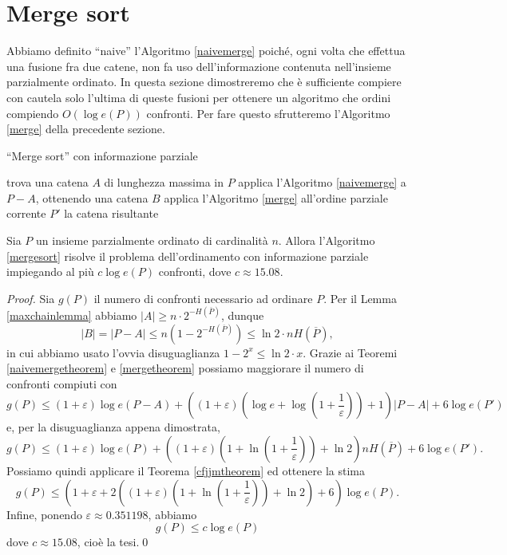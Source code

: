 \section{Merge sort} Abbiamo definito ``naive'' l'Algoritmo \ref{naivemerge} poich\'e, ogni volta che effettua una fusione fra due catene, non fa uso dell'informazione contenuta nell'insieme parzialmente ordinato. In questa sezione dimostreremo che \`e sufficiente compiere con cautela solo l'ultima di queste fusioni per ottenere un algoritmo che ordini compiendo \(O(\log{e(P)})\) confronti. Per fare questo sfrutteremo l'Algoritmo \ref{merge} della precedente sezione. 
\begin{algorithm}
	\caption{``Merge sort'' con informazione parziale} \label{mergesort} 
	\begin{algorithmic}
		[1] \STATE trova una catena \(A\) di lunghezza massima in \(P\) \STATE applica l'Algoritmo \ref{naivemerge} a \(P-A\), ottenendo una catena \(B\) \STATE applica l'Algoritmo \ref{merge} all'ordine parziale corrente \(P'\) \RETURN la catena risultante 
	\end{algorithmic}
\end{algorithm}
\begin{theorem}
	\label{mergesorttheorem} Sia \(P\) un insieme parzialmente ordinato di cardinalità \(n\). Allora l'Algoritmo \ref{mergesort} risolve il problema dell'ordinamento con informazione parziale impiegando al più \(c \log{e(P)}\) confronti, dove \(c\approx 15.08\). 
\end{theorem}
\begin{proof}
	Sia \(g(P)\) il numero di confronti necessario ad ordinare \(P\). Per il Lemma \ref{maxchainlemma} abbiamo \(|A|\ge n\cdot 2^{-H(\overline{P})}\), dunque
	\[|B|=|P-A|\le n\left(1-2^{-H(\overline{P})}\right)\le\ln{2}\cdot nH(\overline{P}),\]
	in cui abbiamo usato l'ovvia disuguaglianza \(1-2^{x}\le\ln{2}\cdot x\). Grazie ai Teoremi \ref{naivemergetheorem} e \ref{mergetheorem} possiamo maggiorare il numero di confronti compiuti con
	\[g(P)\le(1+\varepsilon)\log{e(P-A)}+\left((1+\varepsilon)\left(\log{e}+\log{\left(1+\frac{1}{\varepsilon}\right)}\right)+1\right)|P-A|+6\log{e(P')}\]
	e, per la disuguaglianza appena dimostrata,
	\[ g(P)\le(1+\varepsilon)\log{e(P)}+\left((1+\varepsilon)\left(1+\ln{\left(1+\frac{1}{\varepsilon}\right)}\right)+\ln{2}\right)nH(\overline{P})+6\log{e(P')}.\]
	Possiamo quindi applicare il Teorema \ref{cfjjmtheorem} ed ottenere la stima
	\[g(P)\le\left(1+\varepsilon+2\left((1+\varepsilon)\left(1+\ln{\left(1+\frac{1}{\varepsilon}\right)}\right)+\ln{2}\right)+6\right)\log{e(P)}.\]
	Infine, ponendo \(\varepsilon\approx 0.351198\), abbiamo
	\[g(P)\le c\log{e(P)}\nonumber\]
	dove \(c\approx 15.08\), cioè la tesi.\qed 
\end{proof}
